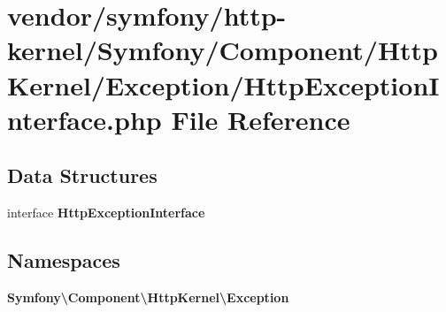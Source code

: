 \section{vendor/symfony/http-\/kernel/\+Symfony/\+Component/\+Http\+Kernel/\+Exception/\+Http\+Exception\+Interface.php File Reference}
\label{_http_exception_interface_8php}
\subsection*{Data Structures}
\begin{DoxyCompactItemize}
\item 
interface {\bf Http\+Exception\+Interface}
\end{DoxyCompactItemize}
\subsection*{Namespaces}
\begin{DoxyCompactItemize}
\item 
 {\bf Symfony\textbackslash{}\+Component\textbackslash{}\+Http\+Kernel\textbackslash{}\+Exception}
\end{DoxyCompactItemize}
